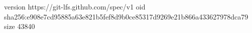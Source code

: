 version https://git-lfs.github.com/spec/v1
oid sha256:e908e7cd95885a63e821b5fef8d9b0ce85317d9269e21b866a433627978dca79
size 43840
